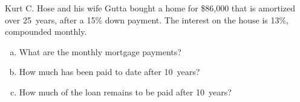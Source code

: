 \documentclass[11pt,letterpaper]{article}
\begin{document}
\newpage





 Kurt C. Hose and his wife Gutta bought a home for \$86,000 that is amortized over 25~years, after a 15\% down payment. The interest on the house is 13\%, compounded monthly. 
\begin{enumerate}[(a)]
\item What are the monthly mortgage payments?
\item How much has been paid to date after 10~years?
\item How much of the loan remains to be paid after 10~years?
\end{enumerate}
\end{document}
